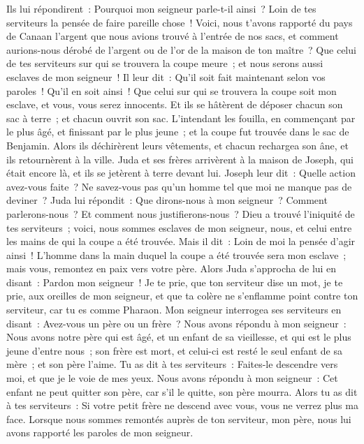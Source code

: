 \begin{multicols}{2}
Ils lui répondirent~: Pourquoi mon seigneur parle-t-il ainsi~? Loin de tes serviteurs la pensée de faire pareille chose~!
Voici, nous t'avons rapporté du pays de Canaan l'argent que nous avions trouvé à l'entrée de nos sacs, et comment aurions-nous dérobé de l'argent ou de l'or de la maison de ton maître~?
Que celui de tes serviteurs sur qui se trouvera la coupe meure~; et nous serons aussi esclaves de mon seigneur~!
Il leur dit~: Qu'il soit fait maintenant selon vos paroles~! Qu'il en soit ainsi~! Que celui sur qui se trouvera la coupe soit mon esclave, et vous, vous serez innocents.
Et ils se hâtèrent de déposer chacun son sac à terre~; et chacun ouvrit son sac.
L'intendant les fouilla, en commençant par le plus âgé, et finissant par le plus jeune~; et la coupe fut trouvée dans le sac de Benjamin.
Alors ils déchirèrent leurs vêtements, et chacun rechargea son âne, et ils retournèrent à la ville.
Juda et ses frères arrivèrent à la maison de Joseph, qui était encore là, et ils se jetèrent à terre devant lui.
Joseph leur dit~: Quelle action avez-vous faite~? Ne savez-vous pas qu'un homme tel que moi ne manque pas de deviner~?
Juda lui répondit~: Que dirons-nous à mon seigneur~? Comment parlerons-nous~? Et comment nous justifierons-nous~? Dieu a trouvé l'iniquité de tes serviteurs~; voici, nous sommes esclaves de mon seigneur, nous, et celui entre les mains de qui la coupe a été trouvée.
Mais il dit~: Loin de moi la pensée d'agir ainsi~! L'homme dans la main duquel la coupe a été trouvée sera mon esclave~; mais vous, remontez en paix vers votre père.
Alors Juda s'approcha de lui en disant~: Pardon mon seigneur~! Je te prie, que ton serviteur dise un mot, je te prie, aux oreilles de mon seigneur, et que ta colère ne s'enflamme point contre ton serviteur, car tu es comme Pharaon.
Mon seigneur interrogea ses serviteurs en disant~: Avez-vous un père ou un frère~?
Nous avons répondu à mon seigneur~: Nous avons notre père qui est âgé, et un enfant de sa vieillesse, et qui est le plus jeune d'entre nous~; son frère est mort, et celui-ci est resté le seul enfant de sa mère~; et son père l'aime.
Tu as dit à tes serviteurs~: Faites-le descendre vers moi, et que je le voie de mes yeux.
Nous avons répondu à mon seigneur~: Cet enfant ne peut quitter son père, car s'il le quitte, son père mourra.
Alors tu as dit à tes serviteurs~: Si votre petit frère ne descend avec vous, vous ne verrez plus ma face.
Lorsque nous sommes remontés auprès de ton serviteur, mon père, nous lui avons rapporté les paroles de mon seigneur.

\end{multicols}
